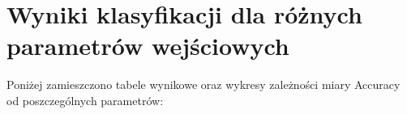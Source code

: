 \documentclass{classrep}
\begin{document}
\section{Wyniki klasyfikacji dla różnych parametrów wejściowych}



Poniżej zamieszczono tabele wynikowe oraz wykresy zależności miary Accuracy od poszczególnych parametrów:
\end{document}
